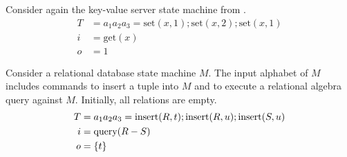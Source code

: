 \begin{example}
  \newcommand{\Mget}{\text{get}}
  \newcommand{\Mset}{\text{set}}
  Consider again the key-value server state machine from
  .
  \begin{align*}
    T &= a_1 a_2 a_3 = \Mset(x, 1); \Mset(x, 2); \Mset(x, 1) \\
    i &= \Mget(x) \\
    o &= 1
  \end{align*}
\end{example}

\begin{example}
  \newcommand{\Mins}{\text{insert}}
  \newcommand{\Mquery}{\text{query}}
  Consider a relational database state machine $M$. The input alphabet of $M$
  includes commands to insert a tuple into $M$ and to execute a relational
  algebra query against $M$. Initially, all relations are empty.
  \begin{align*}
    T &= a_1 a_2 a_3 = \Mins(R, t); \Mins(R, u); \Mins(S, u) \\
    i &= \Mquery(R - S) \\
    o &= \set{t}
  \end{align*}
\end{example}
